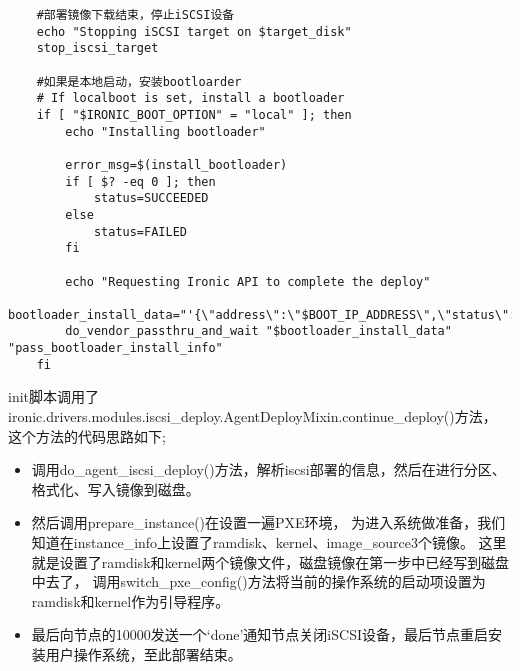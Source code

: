 \documentclass[a4paper,left=1.5cm,right=1.5cm,11pt]{article}
\begin{document}
\begin{lstlisting}
	#部署镜像下载结束，停止iSCSI设备
	echo "Stopping iSCSI target on $target_disk"
	stop_iscsi_target

	#如果是本地启动，安装bootloarder
	# If localboot is set, install a bootloader
	if [ "$IRONIC_BOOT_OPTION" = "local" ]; then
		echo "Installing bootloader"

		error_msg=$(install_bootloader)
		if [ $? -eq 0 ]; then
			status=SUCCEEDED
		else
			status=FAILED
		fi

		echo "Requesting Ironic API to complete the deploy"
	bootloader_install_data="'{\"address\":\"$BOOT_IP_ADDRESS\",\"status\":\"$status\",\"key\":\"$DEPLOYMENT_KEY\",\"error\":\"$error_msg\"}'"
		do_vendor_passthru_and_wait "$bootloader_install_data" "pass_bootloader_install_info"
	fi
	\end{lstlisting}

	init脚本调用了ironic.drivers.modules.iscsi\_deploy.AgentDeployMixin.continue\_deploy()方法，
	这个方法的代码思路如下;
	\begin{itemize}
		\item[1.] 调用do\_agent\_iscsi\_deploy()方法，解析iscsi部署的信息，然后在进行分区、格式化、写入镜像到磁盘。
		\item[2.] 然后调用prepare\_instance()在设置一遍PXE环境，
		为进入系统做准备，我们知道在instance\_info上设置了ramdisk、kernel、image\_source3个镜像。
		这里就是设置了ramdisk和kernel两个镜像文件，磁盘镜像在第一步中已经写到磁盘中去了，
		调用switch\_pxe\_config()方法将当前的操作系统的启动项设置为ramdisk和kernel作为引导程序。 

		\item[3.]  最后向节点的10000发送一个‘done’通知节点关闭iSCSI设备，最后节点重启安装用户操作系统，至此部署结束。
	\end{itemize}
\end{document}
